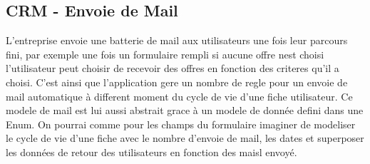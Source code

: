\subsection{CRM - Envoie de Mail}
L'entreprise envoie une batterie de mail aux utilisateurs une fois leur parcours fini, par exemple une fois un formulaire rempli si aucune offre nest choisi l'utilisateur peut choisir de recevoir des offres en fonction des criteres qu'il a choisi. C'est ainsi que l'application gere un nombre de regle pour un envoie de mail automatique à different moment du cycle de vie d'une fiche utilisateur.
Ce modele de mail est lui aussi abstrait grace à un modele de donnée defini dans une Enum. On pourrai comme pour les champs du formulaire imaginer de modeliser le cycle de vie d'une fiche avec le nombre d'envoie de mail, les dates et superposer les données de retour des utilisateurs en fonction des maisl envoyé.